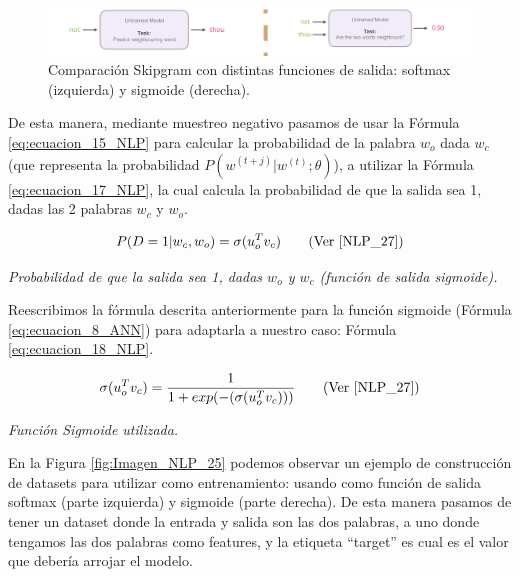 \documentclass[12pt,a4paper]{article}
\begin{document}
\begin{sloppypar}
\begin{figure}[H]    
 \centering
 \includegraphics[width=1\textwidth]{images/NLP/24.png}
 \caption{Comparación Skipgram con distintas funciones de salida: softmax (izquierda) y sigmoide (derecha)\cite{datitos_nlp}.}
 \label{fig:Imagen_NLP_24}
\end{figure}

De esta manera, mediante muestreo negativo pasamos de usar la Fórmula \ref{eq:ecuacion_15_NLP} para calcular la probabilidad de la palabra $w_o$ dada $w_c$ (que representa la probabilidad $P(w^{(t+j)} | w^{(t)}; \theta)$), a utilizar la Fórmula \ref{eq:ecuacion_17_NLP}, la cual calcula la probabilidad de que la salida sea 1, dadas las 2 palabras $w_c$ y $w_o$. 

\begin{equation}\label{eq:ecuacion_17_NLP}
P(D=1 | w_c, w_o) = \sigma (u_{o}^{T} v_c)    \qquad \text{(Ver \cite{NLP_27})}
\end{equation}
\begin{center}
\textit{Probabilidad de que la salida sea 1, dadas $w_o$ y $w_c$ (función de salida sigmoide).}
\end{center}

Reescribimos la fórmula descrita anteriormente para la función sigmoide (Fórmula \ref{eq:ecuacion_8_ANN}) para adaptarla a nuestro caso: Fórmula \ref{eq:ecuacion_18_NLP}.

\begin{equation}\label{eq:ecuacion_18_NLP}
\sigma (u_{o}^{T} v_c) = \frac{1}{1 + exp(- (\sigma (u_{o}^{T} v_c)) )}    \qquad \text{(Ver \cite{NLP_27})}
\end{equation}
\begin{center}
\textit{Función Sigmoide utilizada.}
\end{center}

En la Figura \ref{fig:Imagen_NLP_25} podemos observar un ejemplo de construcción de datasets para utilizar como entrenamiento: usando como función de salida softmax (parte izquierda) y sigmoide (parte derecha). De esta manera pasamos de tener un dataset donde la entrada y salida son las dos palabras, a uno donde tengamos las dos palabras como features, y la etiqueta “target” es cual es el valor que debería arrojar el modelo.


\end{sloppypar}
\end{document}
